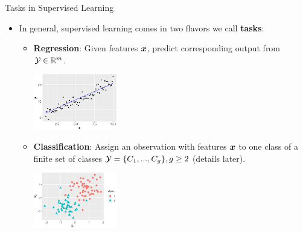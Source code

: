 \documentclass[11pt,compress,t,notes=noshow, xcolor=table]{beamer}
\begin{document}
% 
% 
%   
%   
% 
%   
% 



\begin{vbframe}{Tasks in Supervised Learning}

\begin{itemize}

  \item In general, supervised learning comes in two flavors we call 
  \textbf{tasks}:
  
  \begin{itemize}
  
    \item \textbf{Regression}: Given features $\bm{x}$, predict corresponding 
    output from $\mathcal{Y} \in \mathbb{R}^m$.
  
    \begin{center}
      \includegraphics[width = 0.3\textwidth]{figure/ml-basics-supervised-regression-task.png} 
    \end{center}

    \item \textbf{Classification}: Assign an observation with features $\bm{x}$ to 
    one class of a finite set of classes $\mathcal{Y} = \{C_1,...,C_g\}, g \geq 2$
    (details later).
    \begin{center}
      \includegraphics[width = 0.3\textwidth]{figure/ml-basics-supervised-classif-task.png} 
    \end{center}
  \end{itemize}
\end{itemize}  
\end{vbframe}
\end{document}
